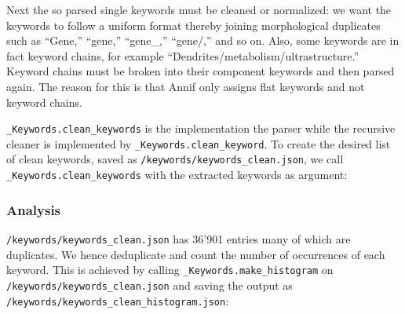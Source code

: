 Next the so parsed single keywords must be cleaned or normalized: we
want the keywords to follow a uniform format thereby joining
morphological duplicates such as ``Gene,'' ``gene,'' ``gene\_,''
``gene/,'' and so on. Also, some keywords are in fact keyword chains,
for example ``Dendrites/metabolism/ultrastructure.'' Keyword chains must
be broken into their component keywords and then parsed again. The
reason for this is that Annif only assigns flat keywords and not keyword
chains.

\texttt{\_Keywords.clean\_keywords} is the implementation the parser
while the recursive cleaner is implemented by
\texttt{\_Keywords.clean\_keyword}. To create the desired list of clean
keywords, saved as \texttt{/keywords/keywords\_clean.json}, we call
\texttt{\_Keywords.clean\_keywords} with the extracted keywords as
argument:

\begin{Shaded}
\begin{Highlighting}[]
\OperatorTok{=}\OperatorTok{+} \NormalTok{)}
\OperatorTok{=}
\OperatorTok{+} \NormalTok{)}
\end{Highlighting}
\end{Shaded}

\hypertarget{analysis-1}{%
\subsubsection{Analysis}\label{analysis-1}}

\texttt{/keywords/keywords\_clean.json} has 36'901 entries many of which
are duplicates. We hence deduplicate and count the number of occurrences
of each keyword. This is achieved by calling
\texttt{\_Keywords.make\_histogram} on
\texttt{/keywords/keywords\_clean.json} and saving the output as
\texttt{/keywords/keywords\_clean\_histogram.json}:

\begin{Shaded}
\begin{Highlighting}[]
\OperatorTok{=}\OperatorTok{+} \NormalTok{)}
\OperatorTok{=}
\OperatorTok{+} \NormalTok{)}
\end{Highlighting}
\end{Shaded}

